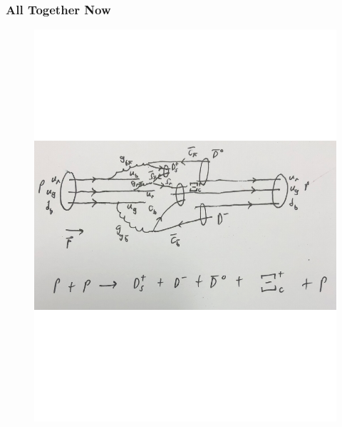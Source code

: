 \documentclass[
	11pt, %
]{beamer}
\begin{document}
\begin{frame}
\frametitle{All Together Now}
\begin{figure}
	\vspace*{-1cm}
	 \hspace*{-0cm}
	\includegraphics[scale=.18]{proton_collision.pdf}

\end{figure}
\end{frame}
\end{document}
